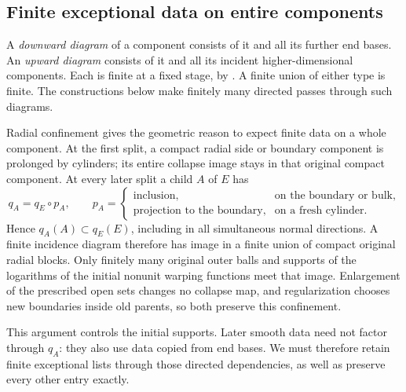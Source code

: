 \subsection{Finite exceptional data on entire components}

A \emph{downward diagram} of a component consists of it and all its further
end bases. An \emph{upward diagram} consists of it and all its incident higher-dimensional components.
Each is finite at a fixed stage, by . A finite union
of either type is finite. The constructions below make finitely many
directed passes through such diagrams.

Radial confinement gives the geometric reason to expect finite data on
a whole component. At the first split, a compact radial side or boundary
component is prolonged by cylinders; its entire collapse image stays
in that original compact component. At every later split a child $A$
of $E$ has
\begin{equation}\label{countable:collapse-recursion}
 q_A=q_E\circ p_A,\qquad
 p_A=\begin{cases}
 \text{inclusion},&\text{on the boundary or bulk},\\
 \text{projection to the boundary},&\text{on a fresh cylinder}.
 \end{cases}
\end{equation}
Hence $q_A(A)\subset q_E(E)$, including in all simultaneous normal
directions. A finite incidence diagram therefore has image in a finite
union of compact original radial blocks. Only finitely many original
outer balls and supports of the logarithms of the initial nonunit warping functions meet that image.
Enlargement of the prescribed open sets changes no collapse map, and regularization chooses new
boundaries inside old parents, so both preserve this confinement.

This argument controls the initial supports. Later smooth data need
not factor through $q_A$: they also use data copied from end bases. We
must therefore retain finite exceptional lists through those directed
dependencies, as well as preserve every other entry exactly.

